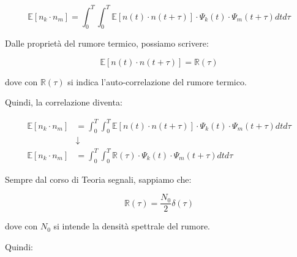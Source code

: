 {
    \Large 
    \begin{equation}
        \mathbb{E} [n_k \cdot n_m]
        = 
        \int_{0}^{T}
        \int_{0}^{T}
        \mathbb{E} 
        \left[
            n(t) \cdot n(t + \tau)
        \right]
        \cdot 
        \Psi_k (t)
        \cdot 
        \Psi_m (t + \tau)
        dt 
        d\tau
    \end{equation}
}

Dalle proprietà del rumore termico, possiamo scrivere: 

{
    \Large 
    \begin{equation}
        \mathbb{E} 
        \left[
            n(t) \cdot n(t + \tau)
        \right]
        = 
        \mathbb{R} (\tau)
    \end{equation}
}

dove con $\mathbb{R} (\tau)$ si indica l'auto-correlazione del rumore termico. \newline 

Quindi, la correlazione diventa: 

{
    \Large 
    \begin{equation}
        \begin{split}
        \mathbb{E} [n_k \cdot n_m]
        &= 
        \int_{0}^{T}
        \int_{0}^{T}
        \mathbb{E} 
        \left[
            n(t) \cdot n(t + \tau)
        \right]
        \cdot 
        \Psi_k (t)
        \cdot 
        \Psi_m (t + \tau)
        dt 
        d\tau
        \\
        &\downarrow
        \\
        \mathbb{E} [n_k \cdot n_m]
        &= 
        \int_{0}^{T}
        \int_{0}^{T} 
       \mathbb{R} (\tau)
        \cdot 
        \Psi_k (t)
        \cdot 
        \Psi_m (t + \tau)
        dt 
        d\tau
        \end{split}
    \end{equation}
}

Sempre dal corso di Teoria segnali, sappiamo che: 

{
    \Large
    \begin{equation}
       \mathbb{R} (\tau)
       = 
       \frac{N_0}{2} \delta(\tau)
    \end{equation}
}

dove con $N_0$ si intende la densità spettrale del rumore. \newline 

Quindi:

